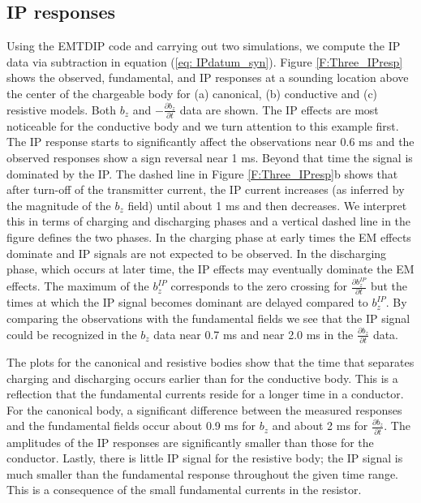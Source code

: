 \documentclass[extra,mreferee]{gji}
\begin{document}
\subsection{IP responses}
Using the  EMTDIP code and carrying out two simulations, we compute the IP data via subtraction in equation (\ref{eq: IPdatum_syn}).
Figure \ref{F:Three_IPresp} shows the observed, fundamental, and IP responses at a sounding location above the center of the chargeable body for (a) canonical, (b) conductive and (c) resistive models. Both $b_z$ and $-\frac{\partial b_z}{\partial t}$ data are shown. 
The IP effects are most noticeable for the conductive body and we turn attention to this example first. The IP response starts to significantly affect the observations near 0.6 ms and the observed responses show a sign reversal near 1 ms. Beyond that time the signal is dominated by the IP. The dashed line in Figure \ref{F:Three_IPresp}b shows that after turn-off of the transmitter current, the IP current increases (as inferred by the magnitude of the $b_z$ field) until about 1 ms and then decreases. We interpret this in terms of charging and discharging phases and a vertical dashed line in the figure defines the two phases. In the charging phase at early times the EM effects dominate and IP signals are not expected to be observed. In the discharging phase, which occurs at  later time, the IP effects may eventually dominate the EM effects. The maximum of the $b_z^{IP}$ corresponds to the zero crossing for $\frac{\partial b_z^{IP}}{\partial t}$ but the times at which the IP signal becomes dominant are delayed compared to $b_z^{IP}$. By comparing the observations with the fundamental fields we see that the IP signal could be recognized in the $b_z$ data near 0.7 ms and near 2.0 ms in the $\frac{\partial b_z}{\partial t}$ data.

The plots for the canonical and resistive bodies show that the time that separates charging and discharging occurs earlier than for the conductive body. This is a reflection that the fundamental currents reside for a longer time in a conductor. For the canonical body, a significant difference between the measured responses and the fundamental fields occur about 0.9 ms for $b_z$ and about 2 ms for $\frac{\partial b_z}{\partial t}$. The amplitudes of the IP responses are significantly smaller than those for the conductor.  Lastly, there is little IP signal for the resistive body; the IP signal is much smaller than the fundamental response throughout the given time range. This is a consequence of the small fundamental currents in the resistor. 
\end{document}
